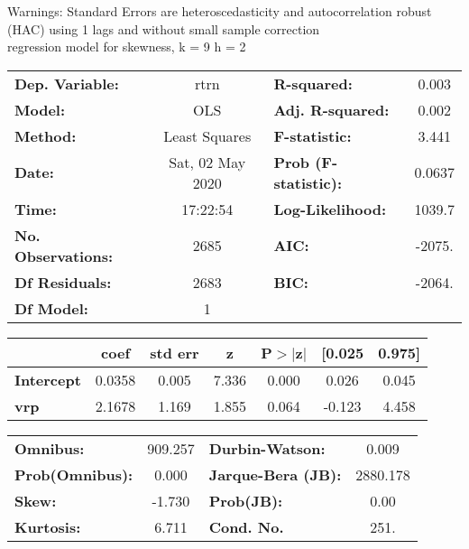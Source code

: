 Warnings: \newline
 [1] Standard Errors are heteroscedasticity and autocorrelation robust (HAC) using 1 lags and without small sample correction\\ 

regression model for skewness, k = 9 h = 2\begin{center}
\begin{tabular}{lclc}
\toprule
\textbf{Dep. Variable:}    &       rtrn       & \textbf{  R-squared:         } &     0.003   \\
\textbf{Model:}            &       OLS        & \textbf{  Adj. R-squared:    } &     0.002   \\
\textbf{Method:}           &  Least Squares   & \textbf{  F-statistic:       } &     3.441   \\
\textbf{Date:}             & Sat, 02 May 2020 & \textbf{  Prob (F-statistic):} &   0.0637    \\
\textbf{Time:}             &     17:22:54     & \textbf{  Log-Likelihood:    } &    1039.7   \\
\textbf{No. Observations:} &        2685      & \textbf{  AIC:               } &    -2075.   \\
\textbf{Df Residuals:}     &        2683      & \textbf{  BIC:               } &    -2064.   \\
\textbf{Df Model:}         &           1      & \textbf{                     } &             \\
\bottomrule
\end{tabular}
\begin{tabular}{lcccccc}
                   & \textbf{coef} & \textbf{std err} & \textbf{z} & \textbf{P$> |$z$|$} & \textbf{[0.025} & \textbf{0.975]}  \\
\midrule
\textbf{Intercept} &       0.0358  &        0.005     &     7.336  &         0.000        &        0.026    &        0.045     \\
\textbf{vrp}       &       2.1678  &        1.169     &     1.855  &         0.064        &       -0.123    &        4.458     \\
\bottomrule
\end{tabular}
\begin{tabular}{lclc}
\textbf{Omnibus:}       & 909.257 & \textbf{  Durbin-Watson:     } &    0.009  \\
\textbf{Prob(Omnibus):} &   0.000 & \textbf{  Jarque-Bera (JB):  } & 2880.178  \\
\textbf{Skew:}          &  -1.730 & \textbf{  Prob(JB):          } &     0.00  \\
\textbf{Kurtosis:}      &   6.711 & \textbf{  Cond. No.          } &     251.  \\
\bottomrule
\end{tabular}
\end{center}

